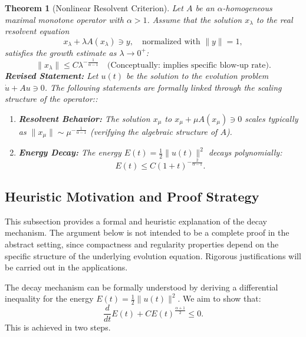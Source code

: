 \documentclass[11pt,reqno]{amsart}
\newtheorem{theorem}{Theorem}[section]
\theoremstyle{remark}
\begin{document}
\begin{theorem}[Nonlinear Resolvent Criterion]
    \label{thm:main}
    Let $A$ be an $\alpha$-homogeneous maximal monotone operator with $\alpha > 1$. Assume that the solution $x_\lambda$ to the real resolvent equation
    \begin{equation}\label{eq:res_eq_thm}
        x_\lambda + \lambda A(x_\lambda) \ni y, \quad \text{normalized with } \|y\|=1,
    \end{equation}
    satisfies the growth estimate as $\lambda \to 0^+$:
    \begin{equation}\label{eq:resolvent_growth}
        \|x_\lambda\| \le C \lambda^{-\frac{1}{\alpha-1}}  \quad \text{(Conceptually: implies specific blow-up rate)}.
    \end{equation}
    \textbf{Revised Statement:} Let $u(t)$ be the solution to the evolution problem $\dot{u} + Au \ni 0$. The following statements are formally linked through the scaling structure of the operator::
    \begin{enumerate}
        \item \textbf{Resolvent Behavior:} The solution $x_\mu$ to $x_\mu + \mu A(x_\mu) \ni 0$ scales typically as $\|x_\mu\| \sim \mu^{-\frac{1}{\alpha-1}}$ (verifying the algebraic structure of $A$).
        \item \textbf{Energy Decay:} The energy $E(t) = \frac{1}{2}\|u(t)\|^2$ decays polynomially:
        \begin{equation}
            E(t) \le C (1+t)^{-\frac{2}{\alpha-1}}.
        \end{equation}
    \end{enumerate}
\end{theorem}



\subsection{Heuristic Motivation and Proof Strategy}
This subsection provides a formal and heuristic explanation of the decay mechanism. The argument below is not intended to be a complete proof in the abstract setting, since compactness and regularity properties depend on the specific structure of the underlying evolution equation. Rigorous justifications will be carried out in the applications.

The decay mechanism can be formally understood by deriving a differential inequality for the energy $E(t) = \frac{1}{2}\|u(t)\|^2$. We aim to show that:
\begin{equation}\label{eq:diff_ineq}
    \frac{d}{dt} E(t) + C E(t)^{\frac{\alpha+1}{2}} \le 0.
\end{equation}
This is achieved in two steps.
\end{document}
